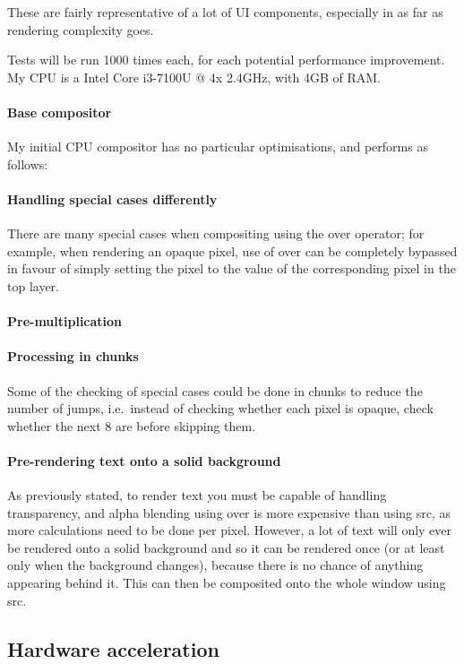 \documentclass[12pt]{article}
\begin{document}
    These are fairly representative of a lot of UI components, especially in as far as rendering complexity goes.

    Tests will be run 1000 times each, for each potential performance improvement. My CPU is a Intel Core i3-7100U @ 4x 2.4GHz, with 4GB of RAM.

    \paragraph{Base compositor}
     My initial CPU compositor has no particular optimisations, and performs as follows:
    \paragraph{Handling special cases differently}
     There are many special cases when compositing using the \textsf{over} operator; for example, when rendering an opaque pixel, use of \textsf{over} can be completely bypassed in favour of simply setting the pixel to the value of the corresponding pixel in the top layer.
    \paragraph{Pre-multiplication}
    \paragraph{Processing in chunks}
     Some of the checking of special cases could be done in chunks to reduce the number of jumps, i.e.~instead of checking whether each pixel is opaque, check whether the next 8 are before skipping them.
    \paragraph{Pre-rendering text onto a solid background}
     As previously stated, to render text you must be capable of handling transparency, and alpha blending using \textsf{over} is more expensive than using \textsf{src}, as more calculations need to be done per pixel. However, a lot of text will only ever be rendered onto a solid background and so it can be rendered once (or at least only when the background changes), because there is no chance of anything appearing behind it. This can then be composited onto the whole window using \textsf{src}.
  \subsection{Hardware acceleration}
\end{document}
